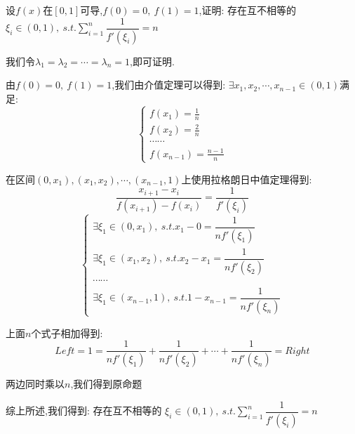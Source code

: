 
\begin{proposition}
	设$f(x)$在$[0,1]$可导,$f(0)=0,\ f(1)=1$,证明: 存在互不相等的 $\xi_{i}\in(0,1),\ s.t. \sum\limits_{i=1}^{n}\dfrac{1}{f'(\xi_{i})}=n$
\end{proposition}
\begin{solution}

	我们令$\lambda_{1}=\lambda_{2}=\cdots=\lambda_{n}=1$,即可证明.

	由$f(0)=0,\ f(1)=1$,我们由介值定理可以得到: $\exists x_{1},x_{2},\cdots,x_{n-1}\in(0,1)$满足:
	$$\left\lbrace
		\begin{array}{l}
			f(x_{1})=\frac{1}{n} \\
			f(x_{2})=\frac{2}{n} \\
			\cdots\cdots         \\
			f(x_{n-1})=\frac{n-1}{n}
		\end{array}
		\right. $$

	在区间$(0,x_{1}),(x_{1},x_{2}),\cdots,(x_{n-1},1)$上使用拉格朗日中值定理得到:
	$$\dfrac{x_{i+1}-x_{i}}{f(x_{i+1})-f(x_{i})}=\dfrac{1}{f'(\xi_{i})}$$
	$$\left\lbrace
		\begin{array}{l}
			\exists\xi_{1}\in(0,x_{1}),\ s.t. x_{1}-0=\dfrac{1}{nf'(\xi_{1})}         \\
			\exists\xi_{1}\in(x_{1},x_{2}),\ s.t. x_{2}-x_{1}=\dfrac{1}{nf'(\xi_{2})} \\
			\cdots\cdots                                                              \\
			\exists\xi_{1}\in(x_{n-1},1),\ s.t. 1-x_{n-1}=\dfrac{1}{nf'(\xi_{n})}
		\end{array}
		\right. $$

	上面$n$个式子相加得到:
	$$Left=1=\dfrac{1}{nf'(\xi_{1})}+\dfrac{1}{nf'(\xi_{2})}+\cdots+\dfrac{1}{nf'(\xi_{n})}=Right$$

	两边同时乘以$n$,我们得到原命题

	综上所述,我们得到: 存在互不相等的 $\xi_{i}\in(0,1),\ s.t. \sum\limits_{i=1}^{n}\dfrac{1}{f'(\xi_{i})}=n$
\end{solution}


